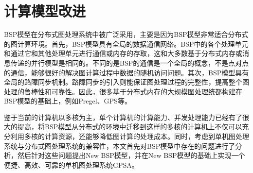 \section{计算模型改进}

BSP模型在分布式图处理系统中被广泛采用，主要是因为BSP模型非常适合分布式的图计算环境。首先，BSP模型具有全局的数据通信网络。BSP中的各个处理单元和通过它和其他处理单元进行通信或内存的存取，这和大多数基于分布式内存或消息传递的并行模型是相同的。不同的是BSP的通信是一个全局的概念，不是点对点的通信，能够很好的解决图计算过程中数据的随机访问问题。其次，BSP模型具有全局的路障同步机制。路障同步的引入则能保证图处理过程的完整性，提高整个图处理的鲁棒性和可靠性。因此，很多基于分布式内存的大规模图处理统都构建在BSP模型的基础上，例如Pregel、GPS等。

鉴于当前的计算机以多核为主，单个计算机的计算能力、并发处理能力已经有了很大的提高，将BSP模型从分布式的环境中迁移到这样的多核的计算机上不仅可以充分利用多核的计算资源，还能够降低图计算的处理成本。同时，考虑到单机图处理系统与分布式图处理系统的兼容性，本文首先对BSP模型中存在的问题进行了分析，然后针对这些问题提出New BSP模型，并在New BSP模型的基础上实现一个便捷、高效、可靠的单机图处理系统GPSA。


